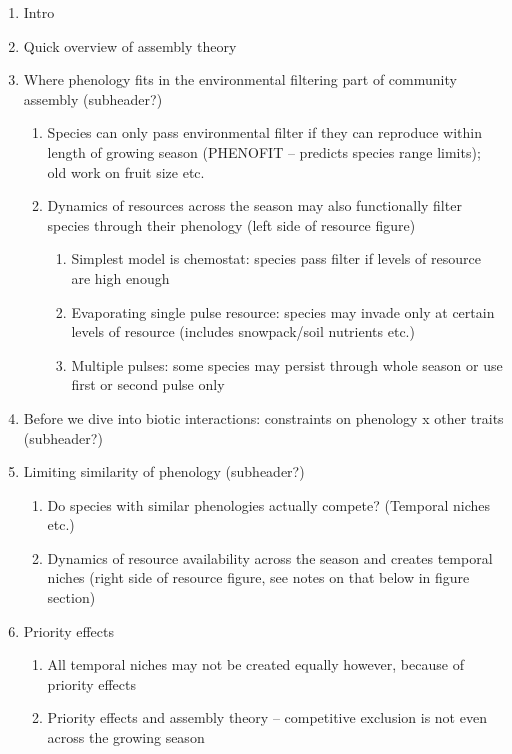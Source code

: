 \documentclass[11pt,letter]{article}
\begin{document}
\begin{enumerate}
\item Intro 
\item Quick overview of assembly theory 
\item Where phenology fits in the environmental filtering part of community assembly (subheader?)
\begin{enumerate}
\item Species can only pass environmental filter if they can reproduce within length of growing season (PHENOFIT -- predicts species range limits); old work on fruit size etc.
\item Dynamics of resources across the season may also functionally filter species through their phenology (left side of resource figure)
\begin{enumerate}
\item Simplest model is chemostat: species pass filter if levels of resource are high enough
\item Evaporating single pulse resource: species may invade only at certain levels of resource (includes snowpack/soil nutrients etc.)
\item Multiple pulses: some species may persist through whole season or use first or second pulse only
\end{enumerate}
\end{enumerate}
\item Before we dive into biotic interactions: constraints on phenology x other traits (subheader?) 
\item Limiting similarity of phenology  (subheader?) %
\begin{enumerate}
\item Do species with similar phenologies actually compete? (Temporal niches etc.)
\item Dynamics of resource availability across the season and creates temporal niches (right side of resource figure, see notes on that below in figure section) %
\end{enumerate}
\item Priority effects %
\begin{enumerate}
\item All temporal niches may not be created equally however, because of priority effects 
\item Priority effects and assembly theory – competitive exclusion is not even across the growing season %

\end{enumerate}
\end{enumerate}
\end{document}
